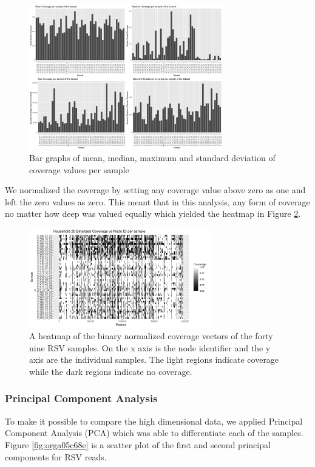 \documentclass[10pt, a4paper]{article}
\begin{document}
\begin{figure}[h]
\centering
\includegraphics[width=0.75\textwidth]{../Figures/RSV/structure_of_coverage_data.png}
\caption[RSV Structure of the Data]{\label{fig:org68a928c}Bar graphs of mean, median, maximum and standard deviation of coverage values per sample}
\end{figure}


We normalized the coverage by setting any coverage value above zero as one and 
left the zero values as zero. This meant that in this analysis, any form of
coverage no matter how deep was valued equally which yielded the heatmap in
Figure \ref{fig:org4444337}.

\begin{figure}[h!]
\centering
\includegraphics[width=0.7\textwidth]{../Figures/RSV/Heatmap.png}
\caption[RSV heatmap]{\label{fig:org4444337}A heatmap of the binary normalized coverage vectors of the forty nine RSV samples. On the x axis is the node identifier and the y axis are the individual samples. The light regions indicate coverage while the dark regions indicate no coverage.}
\end{figure}

\newpage
\subsubsection{Principal Component Analysis}
\label{sec:org0b369bb}
To make it possible to compare the high dimensional data, we applied Principal 
Component Analysis (PCA) which was able to differentiate each of the samples.
Figure \ref{fig:orga05c68e} is a scatter plot of the first and second principal 
components for RSV reads.
\end{document}

